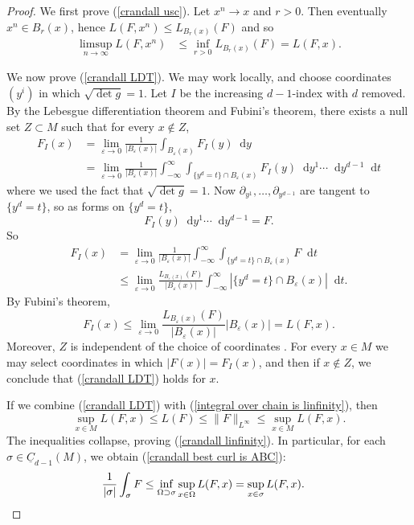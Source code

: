 \documentclass[reqno,11pt]{amsart}
\newcommand*\dif{\mathop{}\!\mathrm{d}}
\newcommand{\Chain}{\underline C}
\theoremstyle{definition}
\numberwithin{equation}{section}
\begin{document}
\begin{proof}
We first prove (\ref{crandall usc}).
Let $x^n \to x$ and $r > 0$. Then eventually $x^n \in B_r(x)$, hence $L(F, x^n) \leq L_{B_r(x)}(F)$ and so
\begin{align*}
\limsup_{n \to \infty} L(F, x^n) &\leq \inf_{r > 0} L_{B_r(x)}(F) = L(F, x).
\end{align*}

We now prove (\ref{crandall LDT}).
We may work locally, and choose coordinates $(y^i)$ in which $\sqrt{\det g} = 1$.
Let $I$ be the increasing $d-1$-index with $d$ removed.
By the Lebesgue differentiation theorem and Fubini's theorem, there exists a null set $Z \subset M$ such that for every $x \notin Z$,
\begin{align*}
F_I(x) 
&= \lim_{\varepsilon \to 0} \frac{1}{|B_\varepsilon(x)|} \int_{B_\varepsilon(x)} F_I(y) \dif y \\
&= \lim_{\varepsilon \to 0} \frac{1}{|B_\varepsilon(x)|} \int_{-\infty}^\infty \int_{\{y^d = t\} \cap B_\varepsilon(x)} F_I(y) \dif y^1 \cdots \dif y^{d - 1} \dif t
\end{align*}
where we used the fact that $\sqrt{\det g} = 1$.
Now $\partial_{y^1}, \dots, \partial_{y^{d - 1}}$ are tangent to $\{y^d = t\}$, so as forms on $\{y^d = t\}$,
$$F_I(y) \dif y^1 \cdots \dif y^{d - 1} = F.$$
So
\begin{align*}
F_I(x) 
&= \lim_{\varepsilon \to 0} \frac{1}{|B_\varepsilon(x)|} \int_{-\infty}^\infty \int_{\{y^d = t\} \cap B_\varepsilon(x)} F \dif t \\
&\leq \lim_{\varepsilon \to 0} \frac{L_{B_\varepsilon(x)}(F)}{|B_\varepsilon(x)|} \int_{-\infty}^\infty |\{y^d = t\} \cap B_\varepsilon(x)| \dif t.
\end{align*}
By Fubini's theorem,
$$F_I(x) \leq \lim_{\varepsilon \to 0} \frac{L_{B_\varepsilon(x)}(F)}{|B_\varepsilon(x)|} |B_\varepsilon(x)| = L(F, x).$$
Moreover, $Z$ is independent of the choice of coordinates \cite[Proposition 2.1]{BackusFLG}.
For every $x \in M$ we may select coordinates in which $|F(x)| = F_I(x)$, and then if $x \notin Z$, we conclude that (\ref{crandall LDT}) holds for $x$.

If we combine (\ref{crandall LDT}) with (\ref{integral over chain is linfinity}), then
$$\sup_{x \in M} L(F, x) \leq L(F) \leq \|F\|_{L^\infty} \leq \sup_{x \in M} L(F, x).$$
The inequalities collapse, proving (\ref{crandall linfinity}).
In particular, for each $\sigma \in \Chain_{d - 1}(M)$, we obtain (\ref{crandall best curl is ABC}):
\begin{align*}
\frac{1}{|\sigma|} \int_\sigma F &\leq \inf_{\Omega \supset \sigma} \sup_{x \in \Omega} L(F, x) = \sup_{x \in \sigma} L(F, x). \qedhere
\end{align*}
\end{proof}
\end{document}
